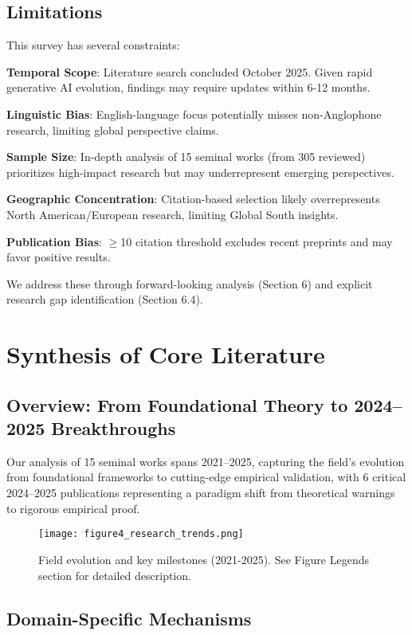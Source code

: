\documentclass[11pt]{article}
\begin{document}
\subsection{Limitations}

This survey has several constraints:

\textbf{Temporal Scope}: Literature search concluded October 2025. Given rapid generative AI evolution, findings may require updates within 6-12 months.

\textbf{Linguistic Bias}: English-language focus potentially misses non-Anglophone research, limiting global perspective claims.

\textbf{Sample Size}: In-depth analysis of 15 seminal works (from 305 reviewed) prioritizes high-impact research but may underrepresent emerging perspectives.

\textbf{Geographic Concentration}: Citation-based selection likely overrepresents North American/European research, limiting Global South insights.

\textbf{Publication Bias}: $\geq$10 citation threshold excludes recent preprints and may favor positive results.

We address these through forward-looking analysis (Section 6) and explicit research gap identification (Section 6.4).

\section{Synthesis of Core Literature}

\subsection{Overview: From Foundational Theory to 2024–2025 Breakthroughs}

Our analysis of 15 seminal works spans 2021–2025, capturing the field's evolution from foundational frameworks to cutting-edge empirical validation, with 6 critical 2024–2025 publications representing a paradigm shift from theoretical warnings to rigorous empirical proof.

\begin{figure}[H]
\centering
\texttt{[image: figure4\_research\_trends.png]}
\caption{Field evolution and key milestones (2021-2025). See Figure Legends section for detailed description.}
\label{fig:trends}
\end{figure}

\subsection{Domain-Specific Mechanisms}
\end{document}
